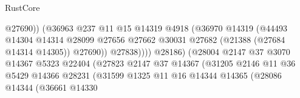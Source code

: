 \begin{lexlean}{RustCore}
\begin{coremodule}
                                                  @27690))
                                              (@36963
                                                @237
                                                @11
                                                @15
                                                @14319
                                                @4918
                                                (@36970
                                                  @14319
                                                  (@44493
                                                    @14304
                                                    @14314
                                                    @28099
                                                    @27656
                                                    @27662
                                                    @30031
                                                    @27682
                                                    (@21388 (@27684 @14314 @14305))
                                                    @27690))
                                                @27838))))
                                        @28186)
                                      (@28004
                                        @2147
                                        @37
                                        @3070
                                        @14367
                                        @5323
                                        @22404
                                        (@27823
                                          @2147
                                          @37
                                          @14367
                                          (@31205
                                            @2146
                                            @11
                                            @36
                                            @5429
                                            @14366
                                            @28231
                                            (@31599
                                              @1325
                                              @11
                                              @16
                                              @14344
                                              @14365
                                              (@28086
                                                @14344
                                                (@36661
                                                  @14330

\end{coremodule}
\end{lexlean}
